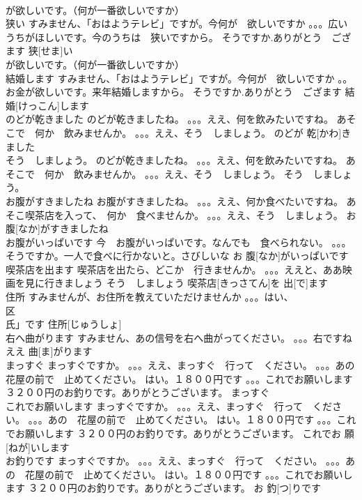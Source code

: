 \documentclass[8pt]{extreport}
\begin{document}
\begin{CJK}{UTF8}{min}
\\	が欲しいです。（何が一番欲しいですか）	
\\	狭い	すみません、「おはようテレビ」ですが。今何が　欲しいですか 。。。広いうちがほしいです。今のうちは　狭いですから。 そうですか.ありがとう　ござます	狭[せま]い				
\\	が欲しいです。（何が一番欲しいですか）	
\\	結婚します	すみません、「おはようテレビ」ですが。今何が　欲しいですか 。。お金が欲しいです。来年結婚しますから。 そうですか.ありがとう　ござます	結婚[けっこん]します					
\\	のどが乾きました	のどが乾きましたね。 。。。ええ、何を飲みたいですね。 あそこで　何か　飲みませんか。 。。。ええ、そう　しましょう。	のどが 乾[かわ]きました			
\\	そう　しましょう。	のどが乾きましたね。 。。。ええ、何を飲みたいですね。 あそこで　何か　飲みませんか。 。。。ええ、そう　しましょう。	そう　しましょう。			
\\	お腹がすきましたね	お腹がすきましたね。 。。。ええ、何か食べたいですね。 あそこ喫茶店を入って、　何か　食べませんか。 。。。ええ、そう　しましょう。	お 腹[なか]がすきましたね			
\\	お腹がいっぱいです	今　お腹がいっぱいです。なんでも　食べられない。 。。。そうですか。一人で食べに行かないと。さびしいな	お 腹[なか]がいっぱいです			
\\	喫茶店を出ます	喫茶店を出たら、どこか　行きませんか。 。。。ええと、ああ映画を見に行きましょう そう　しましょう	喫茶店[きっさてん]を 出[で]ます			
\\	住所	すみませんが、お住所を教えていただけませんか 。。。はい、
\\	区　
\\	氏」です	住所[じゅうしょ]			
\\	右へ曲がります	すみません、あの信号を右へ曲がってください。 。。。右ですね ええ	曲[ま]がります			
\\	まっすぐ	まっすぐですか。 。。。ええ、まっすぐ　行って　ください。 。。。あの　花屋の前で　止めてください。 はい。１８００円です 。。。これでお願いします ３２００円のお釣りです。ありがとうございます。	まっすぐ			
\\	これでお願いします	まっすぐですか。 。。。ええ、まっすぐ　行って　ください。 。。。あの　花屋の前で　止めてください。 はい。１８００円です 。。。これでお願いします ３２００円のお釣りです。ありがとうございます。	これでお 願[ねが]いします			
\\	お釣りです	まっすぐですか。 。。。ええ、まっすぐ　行って　ください。 。。。あの　花屋の前で　止めてください。 はい。１８００円です 。。。これでお願いします ３２００円のお釣りです。ありがとうございます。	お 釣[つ]りです			

\end{CJK}
\end{document}
